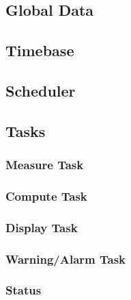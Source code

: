 \documentclass[12pt]{article} %
\begin{document}
    \subsection{Global Data}
    
    

    \subsection{Timebase}
    

    \subsection{Scheduler}
    
    

    \subsection{Tasks}
    \subsubsection{Measure Task}
    
    

    \subsubsection{Compute Task}
    
    

    \subsubsection{Display Task}
    
    

    \subsubsection{Warning/Alarm Task}
    
    

    \subsubsection{Status}
    
    

    
\end{document}
